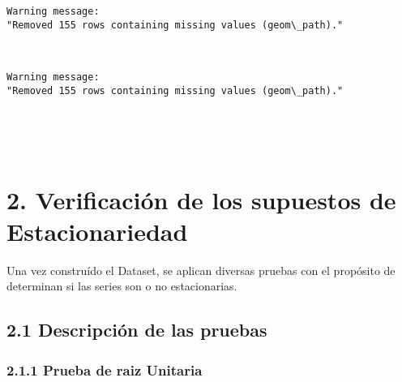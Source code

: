 \documentclass[11pt]{article}
\begin{document}
    \begin{Verbatim}[commandchars=\\\{\}]
Warning message:
"Removed 155 rows containing missing values (geom\_path)."
    \end{Verbatim}

    \begin{center}
    \end{center}
    { \hspace*{\fill} \\}
    
    \begin{Verbatim}[commandchars=\\\{\}]
Warning message:
"Removed 155 rows containing missing values (geom\_path)."
    \end{Verbatim}

    \begin{center}
    \end{center}
    { \hspace*{\fill} \\}
    
    \begin{center}
    \end{center}
    { \hspace*{\fill} \\}
    
    \hypertarget{verificaciuxf3n-de-los-supuestos-de-estacionariedad}{%
\section{ 2. Verificación de los supuestos de
Estacionariedad}\label{verificaciuxf3n-de-los-supuestos-de-estacionariedad}}

    Una vez construído el Dataset, se aplican diversas pruebas con el
propósito de determinan si las series son o no estacionarias.

    \hypertarget{descripciuxf3n-de-las-pruebas}{%
\subsection{2.1 Descripción de las
pruebas}\label{descripciuxf3n-de-las-pruebas}}

    \hypertarget{prueba-de-raiz-unitaria}{%
\subsubsection{2.1.1 Prueba de raiz
Unitaria}\label{prueba-de-raiz-unitaria}}
\end{document}

